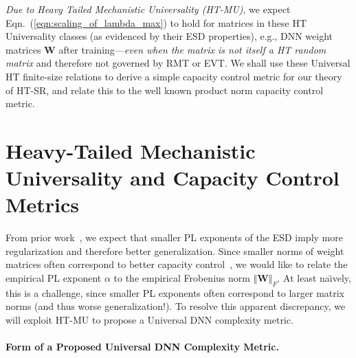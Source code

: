 \emph{Due to Heavy Tailed Mechanistic Universality (HT-MU)}, we expect Eqn.~(\ref{eqn:scaling_of_lambda_max}) to hold for matrices in these HT Universality classes (as evidenced by their ESD properties), e.g., DNN weight matrices $\mathbf{W}$ after training---\emph{even when the matrix is not itself a HT random matrix} and therefore not governed by RMT or EVT.
We shall use these Universal HT finite-size relations to derive a simple capacity control metric for our theory of HT-SR, and relate this to the well known product norm capacity control metric.




\section{Heavy-Tailed Mechanistic Universality and Capacity Control Metrics}
\label{sxn:theory-new}


%
From prior work~\cite{MM18_TR}, we expect that smaller PL exponents of the ESD imply more regularization and therefore better generalization. 
Since smaller norms of weight matrices often correspond to better capacity control~\cite{LMBx18_TR,SHNx17_TR,PLMx18_TR,BFT17_TR}, we would like to relate the empirical PL exponent $\alpha$ to the empirical Frobenius norm $\Vert\mathbf{W}\Vert_{F}$.
At least na\"{\i}vely, this is a challenge, since smaller PL exponents often correspond to larger matrix norms (and thus worse generalization!).
To resolve this apparent discrepancy, we will exploit HT-MU to propose a Universal DNN complexity metric.

\paragraph{Form of a Proposed Universal DNN Complexity Metric.} 


